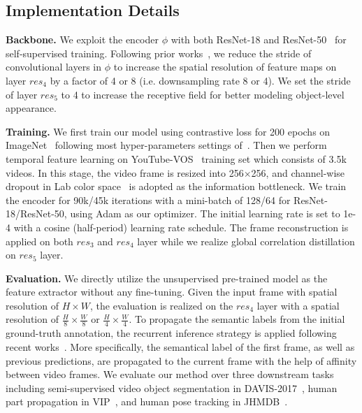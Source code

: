 \documentclass{article}
\begin{document}
\subsection{Implementation Details}
\textbf{Backbone.} We exploit the encoder $\phi$ with both ResNet-18 and ResNet-50~\cite{he2016deep} for self-supervised training. Following prior works~\cite{jabri2020space}\cite{lai2020mast}\cite{xu2021rethinking}, we reduce the stride of convolutional layers in $\phi$ to increase the spatial resolution of feature maps on layer $res_4$  by a factor of 4 or 8 (i.e. downsampling rate 8 or 4). We set the stride of layer $res_5$ to 4 to increase the receptive field for better modeling object-level appearance. 

\textbf{Training.}
We first train our model using contrastive loss for 200 epochs on ImageNet~\cite{deng2009imagenet} following most hyper-parameters settings of~\cite{he2020momentum}. Then we perform temporal feature learning on YouTube-VOS~\cite{xu2018youtube} training set which consists of 3.5k videos. In this stage, the video frame is resized into 256$\times$256, and channel-wise dropout in Lab color space~\cite{lai2019self}\cite{lai2020mast} is adopted as the information bottleneck. We train the encoder for 90k/45k iterations with a mini-batch of 128/64 for ResNet-18/ResNet-50,  using Adam as our optimizer. The initial learning rate is set to 1e-4 with a cosine (half-period) learning rate schedule. The frame reconstruction is applied on both $res_3$ and $res_4$ layer while we realize global correlation distillation on $res_5$ layer. 

\textbf{Evaluation.}
 We directly utilize the unsupervised pre-trained model as the feature extractor without any fine-tuning. Given the input frame with  spatial resolution of $H\times W$, the evaluation is realized on the $res_4$ layer with a spatial resolution of $\frac{H}{8} \times \frac{W}{8}$ or $\frac{H}{4} \times \frac{W}{4}$. To propagate the semantic labels from the initial ground-truth annotation, the recurrent inference strategy is applied following recent works~\cite{jabri2020space}\cite{lai2020mast}\cite{xu2021rethinking}. More specifically,  the semantical label of the first frame, as well as previous predictions, are propagated to the current frame with the help of affinity between video frames. We evaluate our method over three downstream tasks including semi-supervised video object segmentation in DAVIS-2017~\cite{pont20172017}, human part propagation in VIP~\cite{zhou2018adaptive}, and human pose tracking in JHMDB~\cite{jhuang2013towards}.
\end{document}
